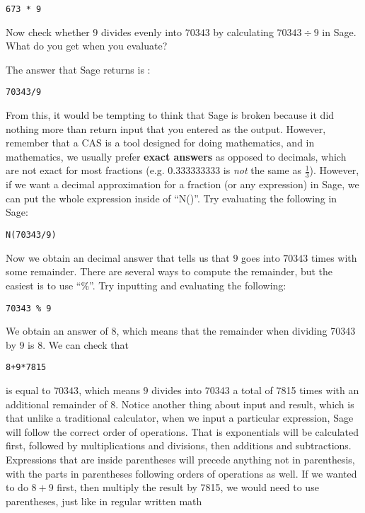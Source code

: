 \begin{verbatim}
673 * 9
\end{verbatim}

Now check whether $9$ divides evenly into $70343$ by calculating
$70343 \div 9$ in Sage. What do you get when you evaluate?

The answer that Sage returns is :

\begin{verbatim}
70343/9
\end{verbatim}

From this, it would be tempting to think that Sage is broken because it
did nothing more than return input that you entered as the output.
However, remember that a CAS is a tool designed for doing mathematics,
and in mathematics, we usually prefer \textbf{exact answers} as opposed
to decimals, which are not exact for most fractions (e.g. 0.333333333 is
\textit{not} the same as $\frac{1}{3}$). However, if we want a
decimal approximation for a fraction (or any expression) in Sage, we can
put the whole expression inside of ``N()''. Try evaluating the following in
Sage:

\begin{verbatim}
N(70343/9)
\end{verbatim}

Now we obtain an decimal answer that tells us that $9$ goes into $70343$
times with some remainder. There are several ways to compute the
remainder, but the easiest is to use ``\%''. Try inputting and evaluating the
following:

\begin{verbatim}
70343 % 9
\end{verbatim}

We obtain an answer of 8, which means that the remainder when dividing
70343 by $9$ is 8. We can check that

\begin{verbatim}
8+9*7815
\end{verbatim}

is equal to $70343$, which means $9$ divides into 70343 a total of
7815 times with an additional remainder of 8. Notice another thing
about input and result, which is that unlike a traditional calculator,
when we input a particular expression, Sage will follow the correct
order of operations. That is exponentials will be calculated first,
followed by multiplications and divisions, then additions and subtractions.
Expressions that are inside parentheses will precede anything not
in parenthesis, with the parts in parentheses following orders of
operations as well. If we wanted to do $8+9$ first, then multiply the
result by 7815, we would need to use parentheses, just like in
regular written math

